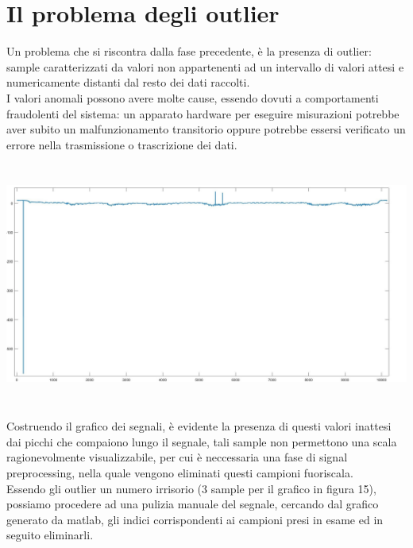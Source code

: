 \documentclass[a4paper, oneside]{book}
\begin{document}
\section{Il problema degli outlier}
Un problema che si riscontra dalla fase precedente, è la presenza di outlier: sample caratterizzati da valori non appartenenti ad un intervallo di valori attesi e numericamente distanti dal resto dei dati raccolti.  \\
I valori anomali possono avere molte cause, essendo dovuti a comportamenti fraudolenti del sistema: un apparato hardware per eseguire misurazioni potrebbe aver subito un malfunzionamento transitorio oppure potrebbe essersi verificato un errore nella trasmissione o trascrizione dei dati. \\
\begin{minipage}{\linewidth}
\begin{center}
\vspace{7mm}
\includegraphics[width=154mm, height= 80mm]{./images/registrazione_tesi/outliers.jpg} 
\vspace{7mm}
\end{center}
\end{minipage}
\makebox[\linewidth]{}
Costruendo il grafico dei segnali, è evidente la presenza di questi valori inattesi dai picchi che compaiono lungo il segnale, tali sample non permettono una scala ragionevolmente visualizzabile, per cui è neccessaria una fase di signal preprocessing, nella quale vengono eliminati questi campioni fuoriscala. \\
Essendo gli outlier un numero irrisorio (3 sample per il grafico in figura 15), possiamo procedere ad una pulizia manuale del segnale, cercando dal grafico generato da matlab, gli indici corrispondenti ai campioni presi in esame ed in seguito eliminarli.
\end{document}
